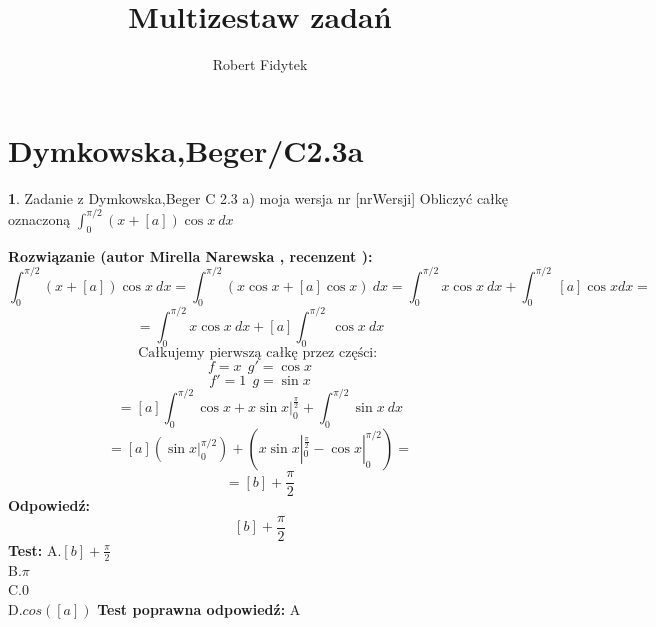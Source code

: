 \documentclass[12pt, a4paper]{article}
\title{Multizestaw zadań}
\author{Robert Fidytek}
\date{}
\theoremstyle{definition} %
\newtheorem{zad}{}
\newcommand{\kategoria}[1]{\section{#1}} %
\newcommand{\zadStart}[1]{\begin{zad}#1\newline} %
\newcommand{\zadStop}{\end{zad}}   %
\newcommand{\rozwStart}[2]{\noindent \textbf{Rozwiązanie (autor #1 , recenzent #2): }\newline} %
\newcommand{\odpStart}{\noindent \textbf{Odpowiedź:}\newline}    %
\newcommand{\odpStop}{\newline}                                             %
\newcommand{\testStart}{\noindent \textbf{Test:}\newline} %
\newcommand{\testStop}{\newline} %
\newcommand{\kluczStart}{\noindent \textbf{Test poprawna odpowiedź:}\newline} %
\newcommand{\kluczStop}{\newline} %
\begin{document}
\maketitle



\kategoria{Dymkowska,Beger/C2.3a}
\zadStart{Zadanie z Dymkowska,Beger C 2.3 a) moja wersja nr [nrWersji]}
Obliczyć całkę oznaczoną $\displaystyle \int_{0}^{\pi/2} (x+[a])\cos{x} \ dx $
\zadStop
\rozwStart{Mirella Narewska}{}
$$\int_{0}^{\pi/2} (x+[a])\cos{x} \ dx = \int_{0}^{\pi/2} \left(x\cos{x}+[a]\cos{x}\right)\ dx =\int_{0}^{\pi/2} x\cos{x} \ dx +\int_{0}^{\pi/2}\ [a]\cos{x}dx =$$
$$=\int_{0}^{\pi/2} x\cos{x} \ dx +[a]\int_{0}^{\pi/2}\ \cos{x} \ dx$$
$$\text{Całkujemy pierwszą całkę przez części: }$$
$$f=x \ \ g'=\cos{x}$$
$$f'=1 \ \ g=\sin{x}$$
$$=[a]\int_{0}^{\pi/2} \cos{x} + x\sin{x}|_{0}^{\frac{\pi}{2}} +\int_{0}^{\pi/2} \sin{x} \ dx$$
$$=[a]( \sin{x}|_{0}^{\pi/2}) +(x\sin{x}|_{0}^{\frac{\pi}{2}} -\cos{x}|_{0}^{\pi/2})=$$
$$=[b] +\frac{\pi}{2} $$
\odpStart
$$[b] +\frac{\pi}{2}$$
\odpStop
\testStart
A.$[b] +\frac{\pi}{2}$
\\
B.$\pi$
\\
C.$0$
\\
D.$cos([a])$
\testStop
\kluczStart
A
\kluczStop
\end{document}
